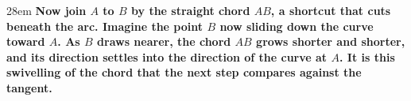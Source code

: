 \documentclass[border=4pt]{standalone}
\begin{document}
\begin{varwidth}{28em}
\large\bfseries
Now join $A$ to $B$ by the straight chord $AB$, a shortcut that cuts beneath the arc. Imagine the point $B$ now sliding down the curve toward $A$. As $B$ draws nearer, the chord $AB$ grows shorter and shorter, and its direction settles into the direction of the curve at $A$. It is this swivelling of the chord that the next step compares against the tangent.
\end{varwidth}
\end{document}
